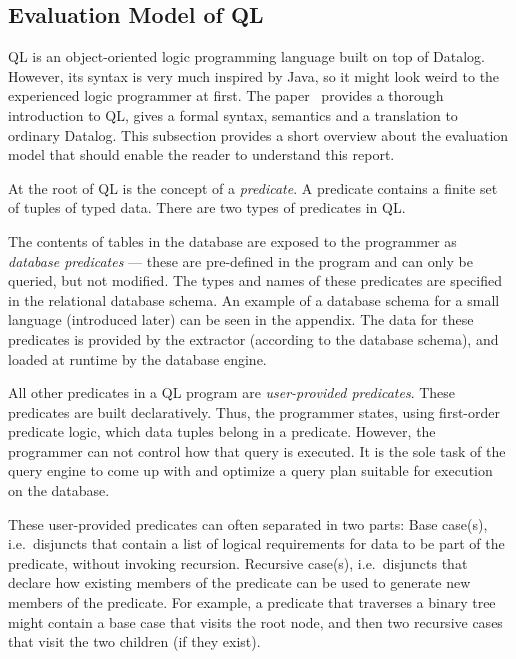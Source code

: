 \subsection{Evaluation Model of QL}
QL is an object-oriented logic programming language built on top of Datalog.
However, its syntax is very much inspired by Java, so it might look weird to the 
experienced logic programmer at first.
The paper~\cite{qlpaper} provides a thorough introduction to QL, gives a 
formal syntax, semantics and a translation to ordinary Datalog.
This subsection provides a short overview about the evaluation model that should
enable the reader to understand this report.

At the root of QL is the concept of a \emph{predicate}.
A predicate contains a finite set of tuples of typed data.
There are two types of predicates in QL.

The contents of tables in the database are exposed to the programmer as \emph{database 
predicates} --- these are pre-defined in the program and can only be queried, but not modified.
The types and names of these predicates are specified in the relational database schema.
An example of a database schema for a small language (introduced later) can be 
seen in the appendix.
The data for these predicates is provided by the extractor (according to the database schema),
and loaded at runtime by the database engine.

All other predicates in a QL program are \emph{user-provided predicates}.
These predicates are built declaratively.
Thus, the programmer states, using first-order predicate logic,
which data tuples belong in a predicate.
However, the programmer can not control how that query is executed.
It is the sole task of the query engine to come up with and optimize a 
query plan suitable for execution on the database.

These user-provided predicates can often separated in two parts:
Base case(s), i.e.\ disjuncts that contain a list of logical requirements for data 
to be part of the predicate, without invoking recursion.
Recursive case(s), i.e.\ disjuncts that declare how existing members of the predicate 
can be used to generate new members of the predicate.
For example, a predicate that traverses a binary tree might contain a base case that visits 
the root node, and then two recursive cases that visit the two children (if they exist).

